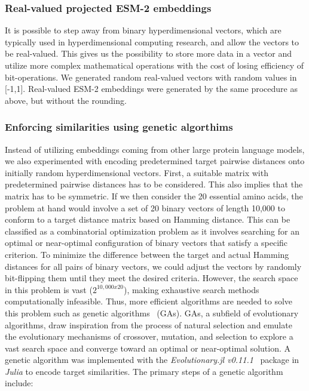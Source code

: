 \subsubsection*{Real-valued projected ESM-2 embeddings}
It is possible to step away from binary hyperdimensional vectors, which are typically used in hyperdimensional computing research, and allow the vectors to be real-valued. This gives us the possibility to store more data in a vector and utilize more complex mathematical operations with the cost of losing efficiency of bit-operations. We generated random real-valued vectors with random values in [-1,1]. Real-valued ESM-2 embeddings were generated by the same procedure as above, but without the rounding.
\subsubsection*{Enforcing similarities using genetic algorthims}
Instead of utilizing embeddings coming from other large protein language models, we also experimented with encoding predetermined target pairwise distances onto initially random hyperdimensional vectors. First, a suitable matrix with predetermined pairwise distances has to be considered. This also implies that the matrix has to be symmetric. If we then consider the 20 essential amino acids, the problem at hand would involve a set of 20 binary vectors of length 10,000 to conform to a target distance matrix based on Hamming distance. This can be classified as a combinatorial optimization problem as it involves searching for an optimal or near-optimal configuration of binary vectors that satisfy a specific criterion. To minimize the difference between the target and actual Hamming distances for all pairs of binary vectors, we could adjust the vectors by randomly bit-flipping them until they meet the desired criteria. However, the search space in this problem is vast ($2^{10,000 x 20}$), making exhaustive search methods computationally infeasible. Thus, more efficient algorithms are needed to solve this problem such as genetic algorithms~\cite{GA} (GAs). GAs, a subfield of evolutionary algorithms, draw inspiration from the process of natural selection and emulate the evolutionary mechanisms of crossover, mutation, and selection to explore a vast search space and converge toward an optimal or near-optimal solution. A genetic algorithm was implemented with the \textit{Evolutionary.jl v0.11.1}~\cite{evojl} package in \textit{Julia} to encode target similarities. The primary steps of a genetic algorithm include:
